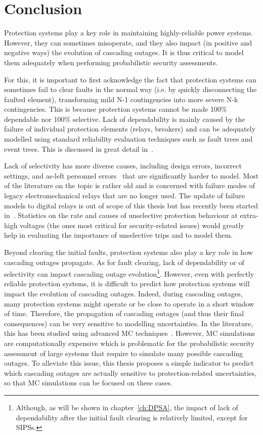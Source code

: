 \section{Conclusion}
\label{sec:protection_conclusion}

Protection systems play a key role in maintaining highly-reliable power systems. However, they can sometimes misoperate, and they also impact (in positive and negative ways) the evolution of cascading outages. It is thus critical to model them adequately when performing probabilistic security assessments.

For this, it is important to first acknowledge the fact that protection systems can sometimes fail to clear faults in the normal way (i.e. by quickly disconnecting the faulted element), transforming mild N-1 contingencies into more severe N-k contingencies. This is because protection systems cannot be made 100\% dependable nor 100\% selective. Lack of dependability is mainly caused by the failure of individual protection elements (relays, breakers) and can be adequately modelled using standard reliability evaluation techniques such as fault trees and event trees. This is discussed in great detail in~\cite{GridPSA, Haarla}.

Lack of selectivity has more diverse causes, including design errors, incorrect settings, and as-left personnel errors~\cite{ProtectionMisoperationsBian2012} that are significantly harder to model. Most of the literature on the topic is rather old and is concerned with failure modes of legacy electromechanical relays that are no longer used. The update of failure models to digital relays is out of scope of this thesis but has recently been started in~\cite{Alexandre_PMAPS}. Statistics on the rate and causes of unselective protection behaviour at extra-high voltages (the ones most critical for security-related issues) would greatly help in evaluating the importance of unselective trips and to model them.

Beyond clearing the initial faults, protection systems also play a key role in how cascading outages propagate. As for fault clearing, lack of dependability or of selectivity can impact cascading outage evolution\footnote{Although, as will be shown in chapter~\ref{ch:DPSA}, the impact of lack of dependability after the initial fault clearing is relatively limited, except for SIPSs.}. However, even with perfectly reliable protection systems, it is difficult to predict how protection systems will impact the evolution of cascading outages. Indeed, during cascading outages, many protection systems might operate or be close to operate in a short window of time. Therefore, the propagation of cascading outages (and thus their final consequences) can be very sensitive to modelling uncertainties. In the literature, this has been studied using advanced MC techniques~\cite{SequencesRelaySobol, TwoLevelPSA}. However, MC simulations are computationally expensive which is problematic for the probabilistic security assessment of large systems that require to simulate many possible cascading outages. To alleviate this issue, this thesis proposes a simple indicator to predict which cascading outages are actually sensitive to protection-related uncertainties, so that MC simulations can be focused on these cases.

